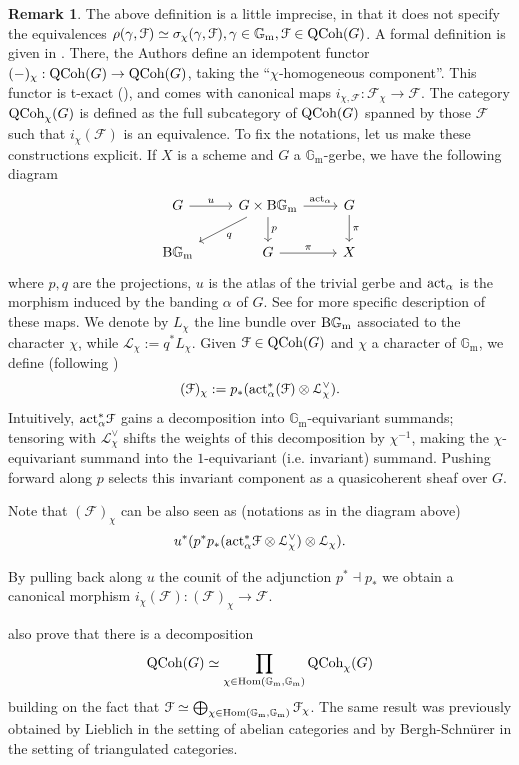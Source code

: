 \documentclass[11pt, twoside]{article} %
\numberwithin{equation}{section}
\theoremstyle{plain}
\theoremstyle{definition}
\newtheorem{rem}[thm]{Remark}
\newcommand{\B}{\textup{B}}
\newcommand{\act}{\textup{act}}
\newcommand{\Gm}{\mathbb G_{\mathrm{m}}}
\newcommand{\QCoh}{\textup{QCoh}}
\newcommand{\cF}{{\mathcal F}}
\newcommand{\cL}{\mathcal L}
\begin{document}
	\begin{rem}\label{remark-homogeneous}The above definition is a little imprecise, in that it does not specify the equivalences $\rho(\gamma,\cF)\simeq \sigma_\chi(\gamma,\cF), \gamma\in \Gm, \cF\in \QCoh(G)$. A formal definition is given in \cite[Definition 5.14]{BP}. There, the Authors define an idempotent functor $(-)_\chi: \QCoh(G)\to \QCoh(G)$, taking the ``$\chi$-homogeneous component''. This functor is t-exact (\cite[Proof of Lemma 5.17]{BP}), and comes with canonical maps $i_{\chi,\cF}:\cF_\chi\to \cF$. The category $\QCoh_\chi(G)$ is defined as the full subcategory of $\QCoh(G)$ spanned by those $\cF$ such that $i_{\chi}(\cF)$ is an equivalence. 
	To fix the notations, let us make these constructions explicit. If $X$ is a scheme and $G$ a $\Gm$-gerbe, we have the following diagram 
	$$\begin{tikzcd}
G \arrow[r, "u"] & G\times \B\Gm \arrow[r, "\act_\alpha"] \arrow[d, "p"] \arrow[ld, "q"] & G \arrow[d, "\pi"] \\
\B\Gm            & G \arrow[r, "\pi"]                                                   & X     \end{tikzcd}$$
	where $p,q$ are the projections, $u$ is the atlas of the trivial gerbe and $\act_{\alpha}$ is the morphism induced by the banding $\alpha$ of $G$. See \cite[Section 5]{BP} for more specific description of these maps. We denote by $L_{\chi}$ the line bundle over $\B\Gm$ associated to the character $\chi$, while $\cL_{\chi}:=q^*L_{\chi}$. Given $\cF \in \QCoh(G)$ and $\chi$ a character of $\Gm$, we define (following \cite[Construction 5.17 and proof of Lemma 5.20]{BP})
	$$ (\cF)_{\chi}:= p_*(\act_{\alpha}^*(\cF) \otimes \cL_{\chi}^{\vee}).$$
Intuitively, $\act_\alpha^* \cF$ gains a decomposition into $\Gm$-equivariant summands; tensoring with $\cL_\chi^\vee$ shifts the weights of this decomposition by $\chi^{-1}$, making the $\chi$-equivariant summand into the $1$-equivariant (i.e. invariant) summand. Pushing forward along $p$ selects this invariant component as a quasicoherent sheaf over $G$.


  Note that $(\cF)_\chi$ can be also seen as (notations as in the diagram above) $$u^*(p^*p_*(\act_\alpha^*\cF\otimes \cL_{\chi}^{\vee})\otimes \cL_\chi).$$ 
  
  By pulling back along $u$ the counit of the adjunction $p^*\dashv p_*$ we obtain a canonical morphism $i_{\chi}(\cF):(\cF)_{\chi} \rightarrow \cF$.
	
\cite{BP} also prove that there is a decomposition $$\QCoh(G)\simeq\prod_{\chi\in \textup{Hom}(\Gm,\Gm)}\QCoh_\chi(G)$$
    building on the fact that $\cF\simeq \bigoplus_{\chi\in \textup{Hom}(\Gm,\Gm)}\cF_\chi$. The same result was previously obtained by Lieblich in the setting of abelian categories and by Bergh-Schn\"urer in the setting of triangulated categories.\end{rem}
	
\end{document}
